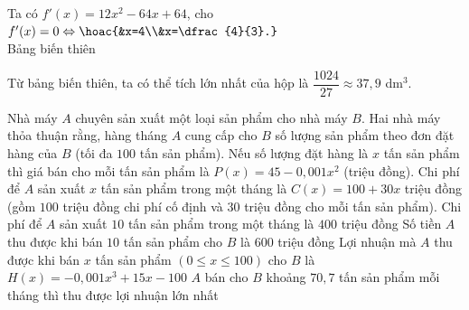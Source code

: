 \begin{bt}
{		Ta có $f'(x)=12x^2 - 64x +64$, cho $f'(x)=0 \Leftrightarrow \hoac{&x=4\\&x=\dfrac{4}{3}.}$\\
		Bảng biến thiên
		\begin{center}
		\end{center}
		Từ bảng biến thiên, ta có thể tích lớn nhất của hộp là $\dfrac{1024}{27} \approx 37{,}9$ dm$^3$.
	}
\end{bt}

\begin{ex}%
 Nhà máy $A$ chuyên sản xuất một loại sản phẩm cho nhà máy $B$. Hai nhà máy thỏa thuận rằng, hàng tháng $A$ cung cấp cho $B$ số lượng sản phẩm theo đơn đặt hàng của $B$ (tối đa $100$ tấn sản phẩm). Nếu số lượng đặt hàng là $x$ tấn sản phẩm thì giá bán cho mỗi tấn sản phẩm là $P(x) = 45 - 0{,}001x^2$ (triệu đồng). Chi phí để $A$ sản xuất $x$ tấn sản phẩm trong một tháng là $C(x) = 100 + 30x$ triệu đồng (gồm $100$ triệu đồng chi phí cố định và $30$ triệu đồng cho mỗi tấn sản phẩm).
 \choiceTF
{\True Chi phí để $A$ sản xuất $10$ tấn sản phẩm trong một tháng là $400$ triệu đồng}
{Số tiền $A$ thu được khi bán $10$ tấn sản phẩm cho $B$ là $600$ triệu đồng}
{\True Lợi nhuận mà $A$ thu được khi bán $x$ tấn sản phẩm $(0 \leq x \leq 100)$ cho $B$ là $H(x) = -0,001x^3 + 15x - 100$}
{\True $A$ bán cho $B$ khoảng $70{,}7$ tấn sản phẩm mỗi tháng thì thu được lợi nhuận lớn nhất}
\end{ex}
